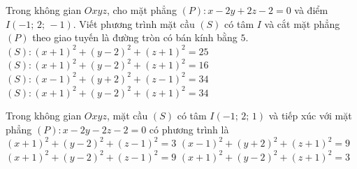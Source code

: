 \begin{ex}%
	Trong không gian $Oxyz$, cho mặt phẳng $\left( P \right)\colon x-2y+2z-2=0$ và điểm $I\left( -1;\,2;\,-1 \right)$. Viết phương trình mặt cầu $\left( S \right)$ có tâm $I$ và cắt mặt phẳng $\left( P \right)$ theo giao tuyến là đường tròn có bán kính bằng $5$.
	\choice
	{$\left( S \right)\colon\left( x+1 \right)^2+\left( y-2 \right)^2+\left( z+1 \right)^2=25$}
	{$\left( S \right)\colon\left( x+1 \right)^2+\left( y-2 \right)^2+\left( z+1 \right)^2=16$}
	{$\left( S \right)\colon\left( x-1 \right)^2+\left( y+2 \right)^2+\left( z-1 \right)^2=34$}
	{\True $\left( S \right)\colon\left( x+1 \right)^2+\left( y-2 \right)^2+\left( z+1 \right)^2=34$}
\end{ex}

\begin{ex}%
	Trong không gian $Oxyz$, mặt cầu $\left( S \right)$ có tâm $I\left( -1;\,2;\,1 \right)$ và tiếp xúc với mặt phẳng $\left( P \right)\colon x-2y-2z-2=0$ có phương trình là
	\choice
	{$\left( x+1 \right)^2+\left( y-2 \right)^2+\left( z-1 \right)^2=3$}
	{$\left( x-1 \right)^2+\left( y+2 \right)^2+\left( z+1 \right)^2=9$}
	{\True $\left( x+1 \right)^2+\left( y-2 \right)^2+\left( z-1 \right)^2=9$}
	{$\left( x+1 \right)^2+\left( y-2 \right)^2+\left( z+1 \right)^2=3$}
\end{ex}


